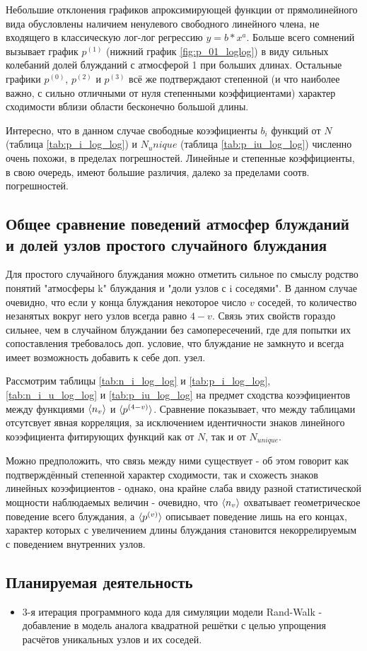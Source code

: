 Небольшие отклонения графиков апроксимирующей функции от прямолинейного вида обусловлены наличием ненулевого свободного линейного члена,
не входящего в классическую лог-лог регрессию $y = b * x^a$.
Больше всего сомнений вызывает график $p^{(1)}$ (нижний график \ref{fig:p_01_loglog}) в виду сильных колебаний долей блужданий с атмосферой 1 при больших длинах.
Остальные графики $p^{(0)}$, $p^{(2)}$ и $p^{(3)}$ всё же подтверждают степенной (и что наиболее важно, с сильно отличными от нуля степенными коэффициентами) характер сходимости вблизи области бесконечно большой длины.

Интересно, что в данном случае свободные коээфициенты $b_i$ функций от $N$ (таблица \ref{tab:p_i_log_log}) и $N_unique$ (таблица \ref{tab:p_iu_log_log}) численно очень похожи, в пределах погрешностей. Линейные и степенные коэффициенты, в свою очередь, имеют большие различия, далеко за пределами соотв. погрешностей.

\subsection{Общее сравнение поведений атмосфер блужданий и долей узлов простого случайного блуждания}

Для простого случайного блуждания можно отметить сильное по смыслу родство понятий "атмосферы k" блуждания и "доли узлов с i соседями". 
В данном случае очевидно, что если у конца блуждания некоторое число $v$ соседей, то количество незанятых вокруг него узлов всегда равно $4-v$. 
Связь этих свойств гораздо сильнее, чем в случайном блуждании без самопересечений, где для попытки их сопоставления требовалось доп. условие, что блуждание не замкнуто и всегда имеет возможность добавить к себе доп. узел.

Рассмотрим таблицы \ref{tab:n_i_log_log} и \ref{tab:p_i_log_log}, \ref{tab:n_i_u_log_log} и \ref{tab:p_iu_log_log} на предмет сходства коээфициентов между функциями $\langle n_v \rangle$ и $\langle p^{(4-v)} \rangle$.
Сравнение показывает, что между таблицами отсутсвует явная корреляция, за исключением идентичности знаков линейного коээфициента фитирующих функций как от $N$, так и от $N_{unique}$. 

Можно предположить, что связь между ними существует - об этом говорит как подтверждённый степенной характер сходимости, так и схожесть знаков линейных коээфициентов - однако, она крайне слаба ввиду разной статистической мощности наблюдаемых величин - очевидно, что $\langle n_v \rangle$ охватывает геометрическое поведение всего блуждания, а $\langle p^{(v)} \rangle$ описывает поведение лишь на его концах, характер которых с увеличением длины блуждания становится некоррелируемым с поведением внутренних узлов.

\subsection{Планируемая деятельность}

\begin{itemize}
\item 3-я итерация программного кода для симуляции модели Rand-Walk - добавление в модель аналога квадратной решётки с целью упрощения расчётов уникальных узлов и их соседей.
\end{itemize}
